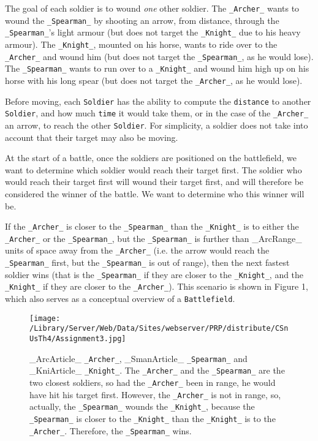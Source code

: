\documentclass[11pt]{article}
\begin{document}
The goal of each soldier is to wound \emph{one} other soldier. The \texttt{_Archer_} wants to wound the \texttt{_Spearman_} by shooting an arrow, from distance, through the \texttt{_Spearman_}'s light armour (but does not target the \texttt{_Knight_} due to his heavy armour). The \texttt{_Knight_}, mounted on his horse, wants to ride over to the \texttt{_Archer_} and wound him (but does not target the \texttt{_Spearman_}, as he would lose). The \texttt{_Spearman_} wants to run over to a \texttt{_Knight_} and wound him high up on his horse with his long spear (but does not target the \texttt{_Archer_}, as he would lose). 

Before moving, each \texttt{Soldier} has the ability to compute the \texttt{distance} to another \texttt{Soldier}, and how much \texttt{time} it would take them, or in the case of the \texttt{_Archer_} an arrow, to reach the other \texttt{Soldier}. For simplicity, a soldier does not take into account that their target may also be moving.

At the start of a battle, once the soldiers are positioned on the battlefield, we want to determine which soldier would reach their target first. The soldier who would reach their target first will wound their target first, and will therefore be considered the winner of the battle. We want to determine who this winner will be.

If the \texttt{_Archer_} is closer to the \texttt{_Spearman_} than the \texttt{_Knight_} is to either the \texttt{_Archer_} or the \texttt{_Spearman_}, but the \texttt{_Spearman_} is further than _ArcRange_ units of space away from the \texttt{_Archer_} (i.e. the arrow would reach the \texttt{_Spearman_} first, but the \texttt{_Spearman_} is out of range), then the next fastest soldier wins (that is the \texttt{_Spearman_} if they are closer to the \texttt{_Knight_}, and the \texttt{_Knight_} if they are closer to the \texttt{_Archer_}). This scenario is shown in Figure 1, which also serves as a conceptual overview of a \texttt{Battlefield}.


\begin{figure}
  	
	\centering
 	
	\texttt{[image: /Library/Server/Web/Data/Sites/webserver/PRP/distribute/CSnUsTh4/Assignment3.jpg]}

	\caption{_ArcArticle_ \texttt{_Archer_}, _SmanArticle_ \texttt{_Spearman_} and _KniArticle_ \texttt{_Knight_}. The \texttt{_Archer_} and the \texttt{_Spearman_} are the two closest soldiers, so had the \texttt{_Archer_} been in range, he would have hit his target first. However, the \texttt{_Archer_} is not in range, so, actually, the \texttt{_Spearman_} wounds the \texttt{_Knight_}, because the \texttt{_Spearman_} is closer to the \texttt{_Knight_} than the \texttt{_Knight_} is to the \texttt{_Archer_}. Therefore, the \texttt{_Spearman_} wins.}

	\label{fig:assignment3}

\end{figure}
\end{document}
